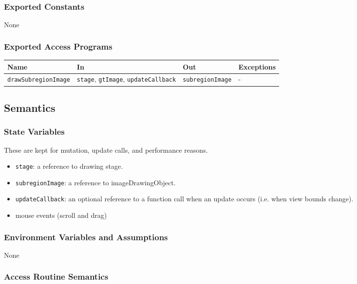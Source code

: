 \documentclass[12pt, titlepage]{article}
\newcommand{\code}[1]{\texttt{#1}}
\begin{document}
\subsubsection{Exported Constants}
None
\subsubsection{Exported Access Programs}

\begin{center}
\begin{tabular}{p{5cm} p{4cm} p{4cm} p{2cm}}
\hline
\textbf{Name} & \textbf{In} & \textbf{Out} & \textbf{Exceptions} \\
\hline
\code{drawSubregionImage} & \code{stage}, \code{gtImage}, \code{updateCallback}
  & \code{subregionImage} & - \\
\hline
\end{tabular}
\end{center}

\subsection{Semantics}

\subsubsection{State Variables}
These are kept for mutation, update calls, and performance reasons.
\begin{itemize}
  \item \code{stage}: a reference to drawing stage.
  \item \code{subregionImage}: a reference to imageDrawingObject.
  \item \code{updateCallback}: an optional reference to a function call when an update occurs
    (i.e. when view bounds change).
  \item mouse events (scroll and drag)
\end{itemize}

\subsubsection{Environment Variables and Assumptions}
None

\subsubsection{Access Routine Semantics}
\end{document}
